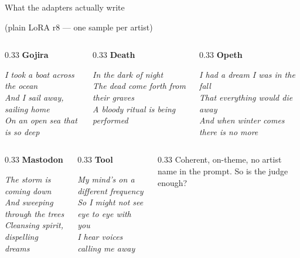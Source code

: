 \documentclass[aspectratio=169]{beamer}
\begin{document}
\begin{frame}[t]{What the adapters actually write}
  \centerline{\footnotesize\color{junk}(plain LoRA r8 --- one sample per artist)}
  \vfill
  \scriptsize
  \begin{columns}[T]
    \begin{column}{0.33\textwidth}
      \textbf{Gojira}\par\itshape
      I took a boat across the ocean\\
      And I sail away, sailing home\\
      On an open sea that is so deep
    \end{column}
    \begin{column}{0.33\textwidth}
      \textbf{Death}\par\itshape
      In the dark of night\\
      The dead come forth from their graves\\
      A bloody ritual is being performed
    \end{column}
    \begin{column}{0.33\textwidth}
      \textbf{Opeth}\par\itshape
      I had a dream I was in the fall\\
      That everything would die away\\
      And when winter comes there is no more
    \end{column}
  \end{columns}
  \vskip8pt
  \begin{columns}[T]
    \begin{column}{0.33\textwidth}
      \textbf{Mastodon}\par\itshape
      The storm is coming down\\
      And sweeping through the trees\\
      Cleansing spirit, dispelling dreams
    \end{column}
    \begin{column}{0.33\textwidth}
      \textbf{Tool}\par\itshape
      My mind's on a different frequency\\
      So I might not see eye to eye with you\\
      I hear voices calling me away
    \end{column}
    \begin{column}{0.33\textwidth}
      \upshape\footnotesize\textcolor{accent}{Coherent, on-theme, no artist name in the prompt. So is the judge enough?}
    \end{column}
  \end{columns}
  \vfill
\end{frame}
\end{document}
